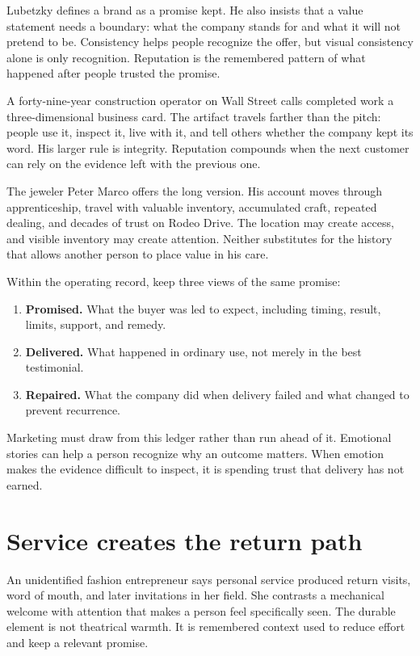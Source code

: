 Lubetzky defines a brand as a promise kept. He also insists that a value
statement needs a boundary: what the company stands for and what it will not
pretend to be. Consistency helps people recognize the offer, but visual
consistency alone is only recognition. Reputation is the remembered pattern of
what happened after people trusted the promise.

A forty-nine-year construction operator on Wall Street calls completed work a
three-dimensional business card. The artifact travels farther than the pitch:
people use it, inspect it, live with it, and tell others whether the company
kept its word. His larger rule is integrity. Reputation compounds when the
next customer can rely on the evidence left with the previous one.

The jeweler Peter Marco offers the long version. His account moves through
apprenticeship, travel with valuable inventory, accumulated craft, repeated
dealing, and decades of trust on Rodeo Drive. The location may create access,
and visible inventory may create attention. Neither substitutes for the
history that allows another person to place value in his care.

Within the operating record, keep three views of the same promise:

\begin{enumerate}[itemsep=0.12em]
\item \textbf{Promised.} What the buyer was led to expect, including timing,
  result, limits, support, and remedy.
\item \textbf{Delivered.} What happened in ordinary use, not merely in the best
  testimonial.
\item \textbf{Repaired.} What the company did when delivery failed and what
  changed to prevent recurrence.
\end{enumerate}

Marketing must draw from this ledger rather than run ahead of it. Emotional
stories can help a person recognize why an outcome matters. When emotion makes
the evidence difficult to inspect, it is spending trust that delivery has not
earned.

\section{Service creates the return path}

An unidentified fashion entrepreneur says personal service produced return
visits, word of mouth, and later invitations in her field. She contrasts a
mechanical welcome with attention that makes a person feel specifically seen.
The durable element is not theatrical warmth. It is remembered context used to
reduce effort and keep a relevant promise.

